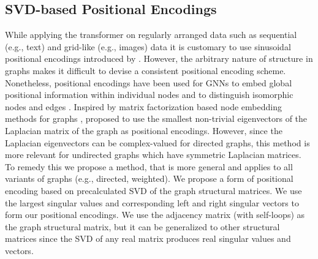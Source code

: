 \documentclass[sigconf,authorversion]{acmart}
\begin{document}
\subsection{SVD-based Positional Encodings}
While applying the transformer on regularly arranged data such as sequential (e.g., text) and grid-like (e.g., images) data it is customary to use sinusoidal positional encodings introduced by \citet{vaswani2017attention}. However, the arbitrary nature of structure in graphs makes it difficult to devise a consistent positional encoding scheme. Nonetheless, positional encodings have been used for GNNs to embed global positional information within individual nodes and to distinguish isomorphic nodes and edges \citep{murphy2019relational,srinivasan2019equivalence}. Inspired by matrix factorization based node embedding methods for graphs \citep{belkin2001laplacian}, \citet{dwivedi2020benchmarking} proposed to use the  smallest non-trivial eigenvectors of the Laplacian matrix of the graph as positional encodings. However, since the Laplacian eigenvectors can be complex-valued for directed graphs, this method is more relevant for undirected graphs which have symmetric Laplacian matrices. To remedy this we propose a method, that is more general and applies to all variants of graphs (e.g., directed, weighted). We propose a form of positional encoding based on precalculated SVD of the graph structural matrices. We use the largest  singular values and corresponding left and right singular vectors to form our positional encodings. We use the adjacency matrix  (with self-loops) as the graph structural matrix, but it can be generalized to other structural matrices since the SVD of any real matrix produces real singular values and vectors.
\end{document}
